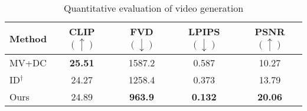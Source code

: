 \begin{table}[t]
\centering
\setlength{\tabcolsep}{4pt} %
\renewcommand{\arraystretch}{1.1} %
\footnotesize %
\begin{tabular}{l|c|c|c|c}
\toprule
\textbf{Method} & \textbf{CLIP} $(\uparrow)$ & \textbf{FVD} $(\downarrow)$ & \textbf{LPIPS} $(\downarrow)$ & \textbf{PSNR} $(\uparrow)$ \\
\midrule
MV+DC & \cellcolor{blue!15}\textbf{25.51} & 1587.2 & 0.587 & 10.27 \\
ID$^{\dagger}$ & 24.27 & 1258.4 & 0.373 & 13.79 \\ \hline
Ours & 24.89 & \cellcolor{blue!15}\textbf{963.9} & \cellcolor{blue!15}\textbf{0.132} & \cellcolor{blue!15}\textbf{20.06} \\
\bottomrule
\end{tabular}
\vspace{-5pt} %
\caption{Quantitative evaluation of video generation}
\label{tab:video_generation_comparison}
\end{table}

